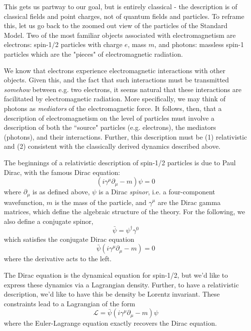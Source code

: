 This gets us partway to our goal, but is entirely classical - the description is of classical fields and 
point charges, not of quantum fields and particles. To reframe this, let us go back to the zoomed out view 
of the particles of the Standard Model. Two of the most familiar objects associated with electromagnetism 
are electrons: spin-1/2 particles with charge $e$, mass $m$, and photons: massless spin-1 particles which are
the "pieces" of electromagnetic radiation.

We know that electrons experience electromagnetic interactions with other objects. Given this, and the 
fact that such interactions must be transmitted \emph{somehow} between e.g. two electrons, it seems natural 
that these interactions are facilitated by electromagnetic radiation. More specifically, we may think of 
photons as \emph{mediators} of the electromagnetic force. It follows, then, that a description of 
electromagnetism on the level of particles must involve a description of both the ``source" particles 
(e.g. electrons), the mediators (photons), and their interactions. Further, this description must be 
(1) relativistic and (2) consistent with the classically derived dynamics described above.

The beginnings of a relativistic description of spin-1/2 particles is due to Paul Dirac, with the 
famous Dirac equation:
\begin{equation}
(i\gamma^{\mu}\partial_{\mu} - m)\psi = 0
\end{equation}
where $\partial_{\mu}$ is as defined above, $\psi$ is a Dirac \emph{spinor}, i.e. a four-component 
wavefunction, $m$ is the mass of the particle, and $\gamma^{\mu}$ are the Dirac gamma matrices, 
which define the algebraic structure of the theory. For the following, we also define a conjugate spinor,
\begin{equation}
\bar{\psi} = \psi^{\dagger}\gamma^{0}
\end{equation}
which satisfies the conjugate Dirac equation
\begin{equation}
\bar{\psi}(i\gamma^{\mu}\partial_{\mu} - m) = 0
\end{equation}
where the derivative acts to the left.

The Dirac equation is the dynamical equation for spin-1/2, but we'd like to express these dynamics 
via a Lagrangian density. Further, to have a relativistic description, we'd like to have this be 
density be Lorentz invariant. These constraints lead to a Lagrangian of the form
\begin{equation}
\mathcal{L} = \bar{\psi}(i\gamma^{\mu}\partial_{\mu} - m)\psi 
\end{equation}
where the Euler-Lagrange equation exactly recovers the Dirac equation.


